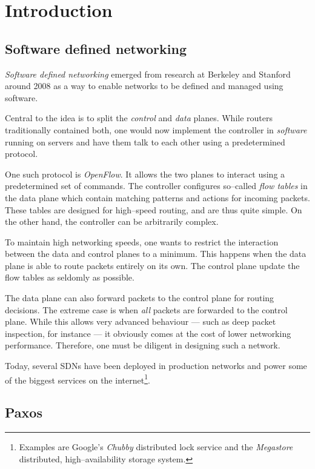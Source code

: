 \chapter{Introduction}

\section{Software defined networking}

{\em Software defined networking} emerged from research at Berkeley and
Stanford around 2008 as a way to enable networks to be defined and managed
using software.

Central to the idea is to split the {\em control} and {\em data} planes.
While routers traditionally contained both, one would now implement the
controller in {\em software} running on servers and have them talk to each
other using a predetermined protocol.

One such protocol is {\em OpenFlow}.  It allows the two planes to interact
using a predetermined set of commands.  The controller configures so--called
{\em flow tables} in the data plane which contain matching patterns and
actions for incoming packets.  These tables are designed for high--speed
routing, and are thus quite simple.  On the other hand, the controller can
be arbitrarily complex.

To maintain high networking speeds, one wants to restrict the interaction
between the data and control planes to a minimum.  This happens when the
data plane is able to route packets entirely on its own.  The control plane
update the flow tables as seldomly as possible.

The data plane can also forward packets to the control plane for routing
decisions. The extreme case is when {\em all} packets are forwarded to the
control plane.  While this allows very advanced behaviour --- such as deep
packet inspection, for instance --- it obviously comes at the cost of
lower networking performance.  Therefore, one must be diligent in designing
such a network.

Today, several SDNs have been deployed in production networks and power some
of the biggest services on the internet\footnote{Examples are Google's {\em
Chubby} distributed lock service and the {\em Megastore} distributed,
high--availability storage system.}.

\section{Paxos}

